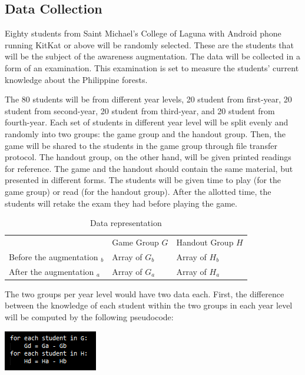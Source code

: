 \documentclass[journal]{./IEEE/IEEEtran}
\begin{document}
\subsection{Data Collection}
Eighty students from Saint Michael's College of Laguna with Android phone running KitKat or above will be randomly selected. These are the students that will be the subject of the awareness augmentation. The data will be collected in a form of an examination. This examination is set to measure the students’ current knowledge about the Philippine forests.

The 80 students will be from different year levels, 20 student from first-year, 20 student from second-year, 20 student from third-year, and 20 student from fourth-year. Each set of students in different year level will be split evenly and randomly into two groups: the game group and the handout group. Then, the game will be shared to the students in the game group through file transfer protocol. The handout group, on the other hand, will be given printed readings for reference. The game and the handout should contain the same material, but presented in different forms. The students will be given time to play (for the game group) or read (for the handout group). After the allotted time, the students will retake the exam they had before playing the game.

\begin{table}[]
\centering
\caption{Data representation}
\label{Data representation}
\begin{tabular}{lll}
                             & Game Group $G$    & Handout Group $H$  \\
Before the augmentation $_b$ & Array of $G_b$    & Array of $H_b$  \\
After the augmentation  $_a$ & Array of $G_a$    & Array of $H_a$  \\
\end{tabular}
\end{table}

The two groups per year level would have two data each. First, the difference between the knowledge of each student within the two groups in each year level will be computed by the following pseudocode:

{\includegraphics{./pseudocode.png}}
\end{document}
